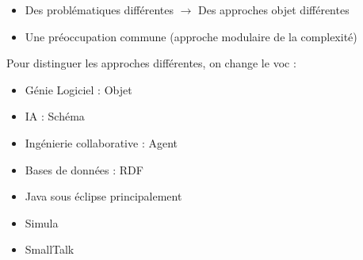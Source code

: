 \begin{itemize}
	\item Des problématiques différentes $\rightarrow$ Des approches objet différentes
	\item Une préoccupation commune (approche modulaire de la complexité)
\end{itemize}
Pour distinguer les approches différentes, on change le voc :
\begin{itemize}
	\item Génie Logiciel : Objet
	\item IA : Schéma
	\item Ingénierie collaborative : Agent
	\item Bases de données : RDF
\end{itemize}

\begin{itemize}
	\item Java sous éclipse principalement
	\item Simula
	\item SmallTalk
\end{itemize}
